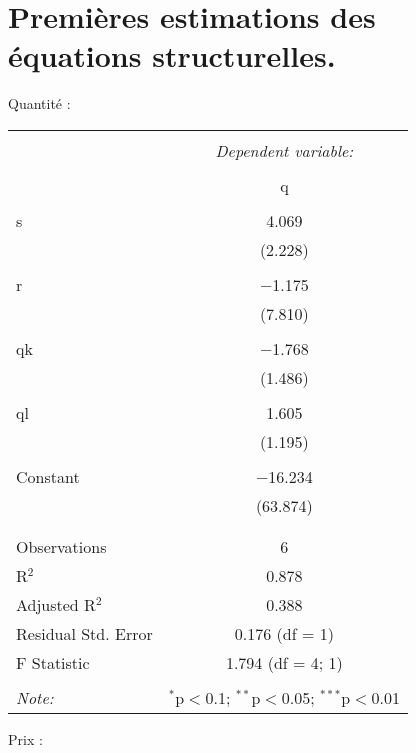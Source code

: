 \documentclass[11pt, a4paper]{article}
\begin{document}
\section*{Premières estimations des équations structurelles.}
\par
Quantité :
\FloatBarrier
\begin{center}
\begin{tabular}{@{\extracolsep{5pt}}lc} 
\\[-1.8ex]\hline 
\hline \\[-1.8ex] 
 & \multicolumn{1}{c}{\textit{Dependent variable:}} \\ 
\cline{2-2} 
\\[-1.8ex] & q \\ 
\hline \\[-1.8ex]
 s & 4.069 \\ 
  & (2.228) \\ 
  & \\ 
 r & $-$1.175 \\ 
  & (7.810) \\ 
  & \\
 qk & $-$1.768 \\ 
  & (1.486) \\ 
  & \\ 
 ql & 1.605 \\ 
  & (1.195) \\ 
  & \\
 Constant & $-$16.234 \\ 
  & (63.874) \\ 
  & \\ 
\hline \\[-1.8ex] 
Observations & 6 \\ 
R$^{2}$ & 0.878 \\ 
Adjusted R$^{2}$ & 0.388 \\ 
Residual Std. Error & 0.176 (df = 1) \\ 
F Statistic & 1.794 (df = 4; 1) \\ 
\hline 
\hline \\[-1.8ex] 
\textit{Note:}  & \multicolumn{1}{r}{$^{*}$p$<$0.1; $^{**}$p$<$0.05; $^{***}$p$<$0.01} 
\\
\end{tabular} 
\end{center}
\FloatBarrier
\newpage
Prix :
\FloatBarrier
\end{document}
